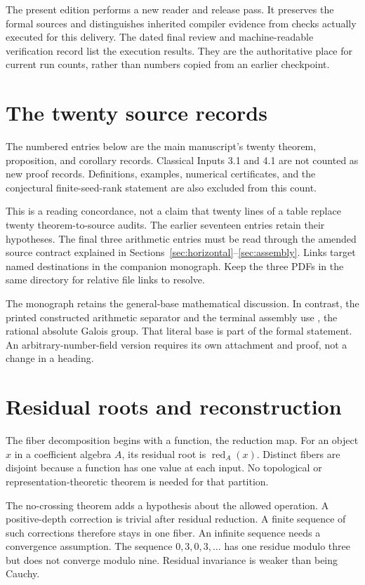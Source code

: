 The present edition performs a new reader and release pass. It preserves the
formal sources and distinguishes inherited compiler evidence from checks actually
executed for this delivery. The dated final review and machine-readable verification
record list the execution results. They are the authoritative place for current
run counts, rather than numbers copied from an earlier checkpoint.

\clearpage
\section{The twenty source records}
\label{sec:register}
The numbered entries below are the main manuscript's twenty theorem, proposition,
and corollary records. Classical Inputs 3.1 and 4.1 are not counted as new proof
records. Definitions, examples, numerical certificates, and the conjectural
finite-seed-rank statement are also excluded from this count.

This is a reading concordance, not a claim that twenty lines of a table replace
twenty theorem-to-source audits. The earlier seventeen entries retain their
hypotheses. The final three arithmetic entries must be read through the amended
source contract explained in Sections~\ref{sec:horizontal}--\ref{sec:assembly}.
Links target named destinations in the companion monograph. Keep the three PDFs
in the same directory for relative file links to resolve.

The monograph retains the general-base mathematical discussion. In contrast, the
printed constructed arithmetic separator and the terminal assembly use
, the rational absolute Galois group. That literal base is part of the
formal statement. An arbitrary-number-field version requires its own attachment
and proof, not a change in a heading.

\clearpage
\section{Residual roots and reconstruction}
The fiber decomposition begins with a function, the reduction map. For an object
$x$ in a coefficient algebra $A$, its residual root is $\operatorname{red}_A(x)$.
Distinct fibers are disjoint because a function has one value at each input.
No topological or representation-theoretic theorem is needed for that partition.

The no-crossing theorem adds a hypothesis about the allowed operation. A
positive-depth correction is trivial after residual reduction. A finite sequence
of such corrections therefore stays in one fiber. An infinite sequence needs a
convergence assumption. The sequence $0,3,0,3,\ldots$ has one residue modulo three
but does not converge modulo nine. Residual invariance is weaker than being Cauchy.

